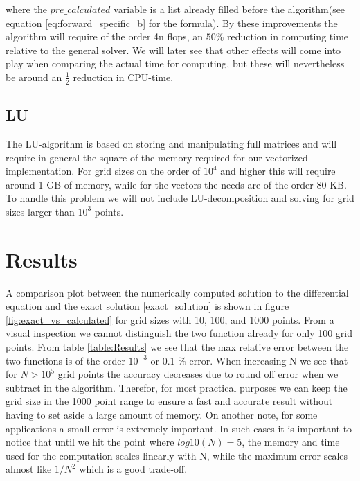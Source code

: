 \documentclass[a4paper,11pt]{article}
\begin{document}
{where the $pre\_ calculated$ variable is a list already filled before the algorithm(see equation \ref{eq:forward_specific_b} for the formula). By these improvements the algorithm will require of the order 4n flops, an $50\%$ reduction in computing time relative to the general solver. We will later see that other effects will come into play when comparing the actual time for computing, but these will nevertheless be around an $\frac{1}{2}$ reduction in CPU-time.  

\subsection{LU}
The LU-algorithm is based on storing and manipulating full matrices and will require in general the square of the memory required for our vectorized implementation. For grid sizes on the order of $10^4$ and higher this will require around 1 GB of memory, while for the vectors the needs are of the order 80 KB. To handle this problem we will not include LU-decomposition and solving for grid sizes larger than $10^3$ points. 

\section*{Results}

A comparison plot between the numerically computed solution to the differential equation and the exact solution \ref{exact_solution} is shown in figure \ref{fig:exact_vs_calculated} for grid sizes with 10, 100, and 1000 points. From a visual inspection we cannot distinguish the two function already for only 100 grid points. From table \ref*{table:Results} we see that the max relative error between the two functions is of the order $10^{-3}$ or 0.1 \% error. When increasing N we see that for $N>10^{5}$ grid points the accuracy decreases due to round off error when we subtract in the algorithm. Therefor, for most practical purposes we can keep the grid size in the 1000 point range to ensure a fast and accurate result without having to set aside a large amount of memory. On another note, for some applications a small error is extremely important. In such cases it is important to notice that until we hit the point where $log10(N)=5$, the memory and time used for the computation scales linearly with N, while the maximum error scales almost like $1/N^2$ which is a good trade-off. 



}
\end{document}
